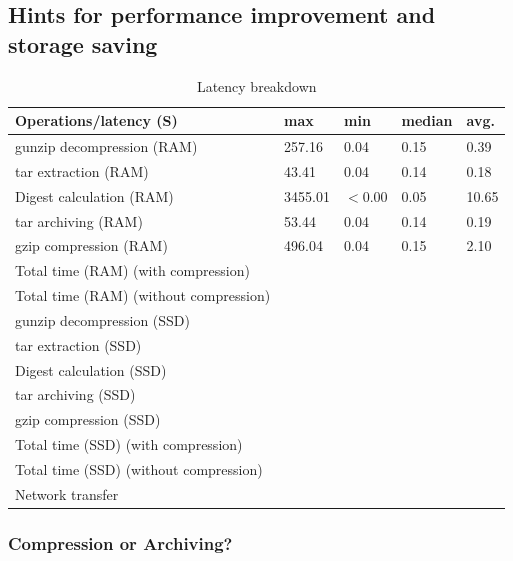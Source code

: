 \subsection{Hints for performance improvement and storage saving}

\begin{table} 
	\centering 
	\scriptsize  
	\caption{Latency breakdown} \label{tbl:latency_breakdown} 
	\begin{tabular}{|l|l|l|l|l|}%
		\hline 
		Operations/latency (S) & max & min & median & avg.\\
		\hline
		 gunzip decompression (RAM) & 257.16  & 0.04  & 0.15  & 0.39 \\
 		\hline
 		tar extraction (RAM) & 43.41  & 0.04  &  0.14  & 0.18 \\
		\hline
		Digest calculation (RAM) & 3455.01  & $<$0.00  & 0.05 & 10.65 \\
		\hline
		tar archiving (RAM)  & 53.44 & 0.04 & 0.14 & 0.19\\
		\hline
		gzip compression (RAM) & 496.04 & 0.04 & 0.15 & 2.10 \\
		\hline
		Total time (RAM) (with compression) & & & & \\
		\hline
		Total time (RAM) (without compression) & & & & \\
		\hline
 		\hline
 		gunzip decompression (SSD) &   &   &    &  \\
 		\hline
 		tar extraction (SSD) &   &   &    &  \\
		\hline
		Digest calculation (SSD) &  &  & & \\
		\hline
		tar archiving (SSD) &  &  & & \\
		\hline
		gzip compression (SSD) & &  &  & \\
		\hline		 
		Total time (SSD) (with compression) & & & & \\
		\hline
		Total time (SSD) (without compression) & & & & \\
		\hline
		\hline
		Network transfer & & & & \\
		\hline 	
	\end{tabular} 
\end{table} 

\subsubsection{Compression or Archiving?} 

